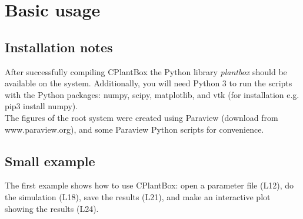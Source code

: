 \newpage
\section{Basic usage} \label{sec:basic}

\subsection{Installation notes}

After successfully compiling CPlantBox the Python library \emph{plantbox} should be available on the system. %
Additionally, you will need Python 3 to run the scripts with the Python packages: numpy, scipy, matplotlib, and vtk (for installation e.g. pip3 install numpy). \\

The figures of the root system were created using Paraview (download from www.paraview.org), and some Paraview Python scripts for convenience. 

\subsection{Small example}

The first example shows how to use CPlantBox: open a parameter file (L12), do the simulation (L18), 
save the results (L21), and make an interactive plot showing the results (L24). 

 

